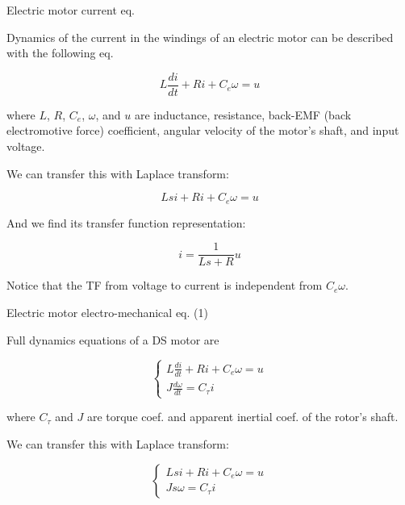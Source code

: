 \documentclass{beamer}
\begin{document}
\begin{frame}{Electric motor current eq.}
\begin{flushleft}

Dynamics of the current in the windings of an electric motor can be described with the following eq.

\begin{equation}
    L \frac{di}{dt} + R i + C_e \omega = u
\end{equation}

where $L$, $R$, $C_e$, $\omega$, and $u$ are inductance, resistance, back-EMF (back electromotive force) coefficient, angular velocity of the motor's shaft, and input voltage.

\bigskip

We can transfer this with Laplace transform:

\begin{equation}
    L s i + R i + C_e \omega = u
\end{equation}

And we find its transfer function representation:

\begin{equation}
    i = \frac{1}{L s + R} u
\end{equation}

Notice that the TF from voltage to current is independent from $C_e \omega$.

\end{flushleft}
\end{frame}




\begin{frame}{Electric motor electro-mechanical eq. (1)}
\begin{flushleft}

Full dynamics equations of a DS motor are

\begin{equation}
    \begin{cases}
    L \frac{di}{dt} + R i + C_e \omega = u \\
    J \frac{d \omega}{dt} = C_\tau i
    \end{cases}
\end{equation}

where $C_\tau$ and $J$ are torque coef. and apparent inertial coef. of the rotor's shaft.

\bigskip

We can transfer this with Laplace transform:

\begin{equation}
    \begin{cases}
    L s i + R i + C_e \omega = u \\
    J s \omega = C_\tau i
    \end{cases}
\end{equation}

\end{flushleft}
\end{frame}
\end{document}
